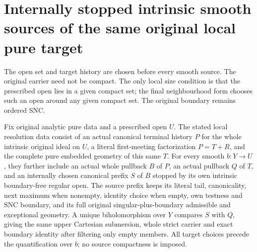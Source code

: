 \section{Internally stopped intrinsic smooth sources of the same original local pure target}
\label{sec:hironaka-original-local-pure-boundary-independent-source}

The open set and target history are chosen before every smooth source.
The original carrier need not be compact. The only local size condition
is that the prescribed open lies in a given compact set; the final
neighbourhood form chooses such an open around any given compact set.
The original boundary remains ordered SNC.

\begin{definition}
\label{hir:original-local-pure-boundary-internal-source-data}
Fix original analytic pure data and a prescribed open $U$. The stated
local resolution data consist of an actual canonical terminal history
$P$ for the whole intrinsic original ideal on $U$, a literal
first-meeting factorization $P=T+R$, and the complete pure embedded
geometry of this same $T$. For every smooth $b:Y\to U$, they further
include an actual whole pullback $B$ of $P$, an actual pullback $Q$ of
$T$, and an internally chosen canonical prefix $S$ of $B$ stopped by
its own intrinsic boundary-free regular open. The source prefix keeps
its literal tail, canonicality, next maximum when nonempty, identity
choice when empty, own testness and SNC boundary, and its full
original singular-plus-boundary admissible and exceptional geometry.
A unique biholomorphism over $Y$ compares $S$ with $Q$, giving the same
upper Cartesian submersion, whole strict carrier and exact boundary
identity after filtering only empty members. All target choices precede
the quantification over $b$; no source compactness is imposed.
\leanok
\end{definition}

